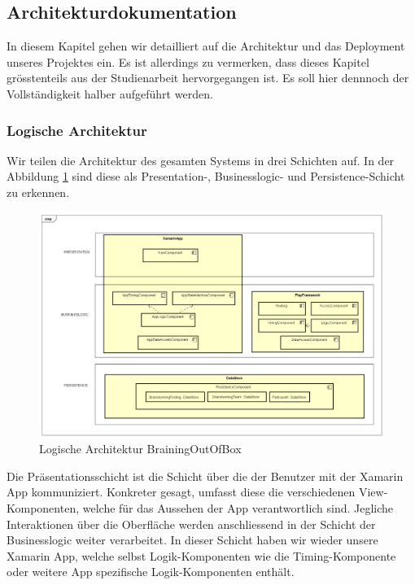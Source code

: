 \subsection{Architekturdokumentation}
\label{architektur}

In diesem Kapitel gehen wir detailliert auf die Architektur und das Deployment unseres Projektes ein. Es ist allerdings zu vermerken, dass dieses Kapitel grösstenteils aus der Studienarbeit \cite{methode635-sa} hervorgegangen ist. Es soll hier dennnoch der Vollständigkeit halber aufgeführt werden.

\subsubsection{Logische Architektur}
Wir teilen die Architektur des gesamten Systems in drei Schichten auf. In der Abbildung \ref{fig:architektur-methode635} sind diese als Presentation-, Businesslogic- und Persistence-Schicht zu erkennen.

\begin{figure}[h]
	\centering
	\includegraphics[width=1\linewidth]{img/architektur/CD_Methode635}
	\caption{Logische Architektur BrainingOutOfBox}
	\label{fig:architektur-methode635}
\end{figure}

Die Präsentationsschicht ist die Schicht über die der Benutzer mit der Xamarin App kommuniziert. Konkreter gesagt, umfasst diese die verschiedenen View-Komponenten, welche für das Aussehen der App verantwortlich sind. Jegliche Interaktionen über die Oberfläche werden anschliessend in der Schicht der Businesslogic weiter verarbeitet. In dieser Schicht haben wir wieder unsere Xamarin App, welche selbst Logik-Komponenten wie die Timing-Komponente oder weitere App spezifische Logik-Komponenten enthält.

